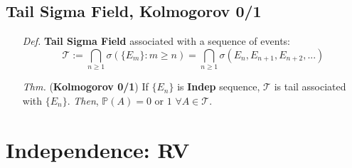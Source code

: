 \documentclass[a4paper,12pt,twoside]{book}
\begin{document}
\subsection{Tail Sigma Field, Kolmogorov 0/1}
\begin{itemize}
	\item[\textit{Def.}] \textbf{Tail Sigma Field} associated with a sequence of events:
	\begin{equation}
		\mathcal{T}:=\bigcap_{n\geq 1}\sigma(\{E_m\}: m\geq n)=\bigcap_{n\geq 1}\sigma(E_n, E_{n+1}, E_{n+2}, ...)
	\end{equation}

	\item[\textit{Thm.}] (\textbf{Kolmogorov 0/1}) If $\{E_n\}$ is \textbf{Indep} sequence, $\mathcal{T}$ is tail associated with $\{E_n\}$. \textit{Then}, $\mathbb{P}\left(A\right)=0$ or $1$ $\forall A\in \mathcal{T}$.
\end{itemize}


\section{Independence: RV}

\end{document}
